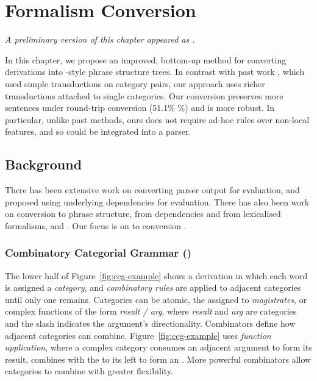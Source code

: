 \newcommand{\old}{\candc{}-Conv\xspace}

\chapter{Formalism Conversion} \label{chp:conversion}

\begin{center}
\textit{
  A preliminary version of this chapter appeared as \textcite{Kummerfeld-etal:2012:ACL}.
}
\end{center}

In this chapter, we propose an improved, bottom-up method for converting \ccg derivations into \ptb-style phrase structure trees.
In contrast with past work \parencite{Clark-Curran:2009}, which used simple transductions on category pairs, our approach uses richer transductions attached to single categories.
Our conversion preserves more sentences under round-trip conversion (51.1\% \%) and is more robust.
In particular, unlike past methods, ours does not require ad-hoc rules over non-local features, and so could be integrated into a parser.

\section{Background}

There has been extensive work on converting parser output for evaluation, \myeg
\textcite{Lin:1998} and \textcite{Briscoe-Carroll-Graham-Copestake:2002} proposed
using underlying dependencies for evaluation.  There has also been work on
conversion to phrase structure, from dependencies \parencite{Xia:2001,Xia:2009} and
from lexicalised formalisms, \myeg \hpsg \parencite{Matsuzaki-Tsujii:2008} and \mytag
\parencite{Chiang:2000,Sarkar:2001}. Our focus is on \ccg to \ptb conversion
\parencite{Clark-Curran:2009}.

\subsection{Combinatory Categorial Grammar (\ccg)}

The lower half of Figure~\ref{fig:ccg-example} shows a \ccg derivation
\parencite{Steedman:2000} in which each word is assigned a {\em category}, and
{\em combinatory rules} are applied to adjacent categories until only one
remains.  Categories can be atomic, \myeg the  assigned to
\textit{magistrates}, or complex functions of the form {\em result / arg}, where
{\em result} and {\em arg} are categories and the slash indicates the argument's
directionality.  Combinators define how adjacent categories can combine.
Figure~\ref{fig:ccg-example} uses {\em function application}, where a complex
category consumes an adjacent argument to form its result, \myeg {} combines with the  to its left to form an .  More
powerful combinators allow categories to combine with greater flexibility.

